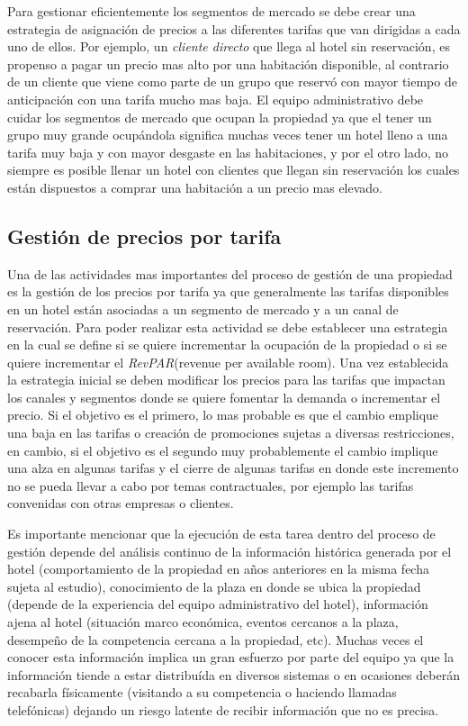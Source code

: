 Para gestionar eficientemente los segmentos de mercado se debe crear una estrategia de asignación de precios a las diferentes tarifas que van dirigidas a cada uno de ellos. Por ejemplo, un \emph{cliente directo} que llega al hotel sin reservación, es propenso a pagar un precio mas alto por una habitación disponible, al contrario de un cliente que viene como parte de un grupo que reservó con mayor tiempo de anticipación con una tarifa mucho mas baja. El equipo administrativ\emph{}o debe cuidar los segmentos de mercado que ocupan la propiedad ya que el tener un grupo muy grande ocupándola significa muchas veces tener un hotel lleno a una tarifa muy baja y con mayor desgaste en las habitaciones, y por el otro lado, no siempre es posible llenar un hotel con clientes que llegan sin reservación los cuales están dispuestos a comprar una habitación a un precio mas elevado.

\subsection*{Gestión de precios por tarifa}

Una de las actividades mas importantes del proceso de gestión de una propiedad es la gestión de los precios por tarifa ya que generalmente las tarifas disponibles en un hotel están asociadas a un segmento de mercado y a un canal de reservación. Para poder realizar esta actividad se debe establecer una estrategia en la cual se define si se quiere incrementar la ocupación de la propiedad o si se quiere incrementar el \emph{RevPAR}(revenue per available room). Una vez establecida la estrategia inicial se deben modificar los precios para las tarifas que impactan los canales y segmentos donde se quiere fomentar la demanda o incrementar el precio. Si el objetivo es el primero, lo mas probable es que el cambio emplique una baja en las tarifas o creación de promociones sujetas a diversas restricciones, en cambio, si el objetivo es el segundo muy probablemente el cambio implique una alza en algunas tarifas y el cierre de algunas tarifas en donde este incremento no se pueda llevar a cabo por temas contractuales, por ejemplo las tarifas convenidas con otras empresas o clientes.

Es importante mencionar que la ejecución de esta tarea dentro del proceso de gestión depende del análisis continuo de la información histórica generada por el hotel (comportamiento de la propiedad en años anteriores en la misma fecha sujeta al estudio), conocimiento de la plaza en donde se ubica la propiedad (depende de la experiencia del equipo administrativo del hotel), información ajena al hotel (situación marco económica, eventos cercanos a la plaza, desempeño de la competencia cercana a la propiedad, etc). Muchas veces el conocer esta información implica un gran esfuerzo por parte del equipo ya que la información tiende a estar distribuída en diversos sistemas o en ocasiones deberán recabarla físicamente (visitando a su competencia o haciendo llamadas telefónicas) dejando un riesgo latente de recibir información que no es precisa.

